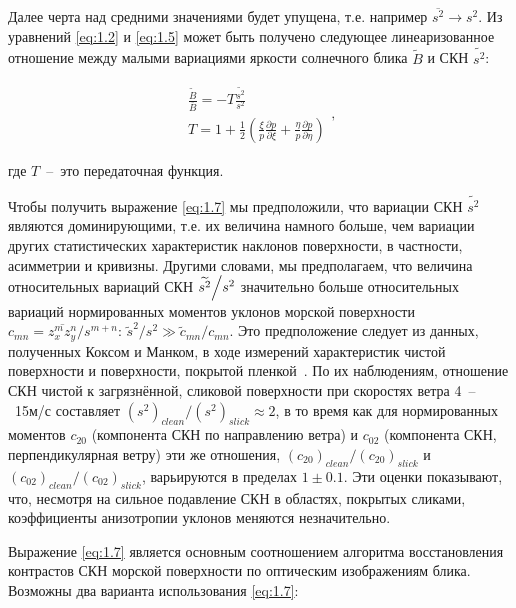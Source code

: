 Далее черта над средними значениями будет упущена, т.е. например $\overline{s^{2} }\to s^{2} $. Из уравнений \eqref{eq:1.2} и \eqref{eq:1.5} может быть получено следующее линеаризованное отношение между малыми вариациями яркости солнечного блика $\tilde{B}$ и СКН $\widetilde{s^{2} }$:


\begin{equation} \label{eq:1.7} 
	\begin{array}{l} {\frac{\tilde{B}}{\overline{B}} =-T\frac{\widetilde{s^{2} }}{s^{2} } }
	\\
	{T = 1+\frac{1}{2} \left(\frac{\xi }{p} \frac{\partial p}{\partial \xi } +\frac{\eta }{p} \frac{\partial p}{\partial \eta } \right)}
	\end{array}, 
\end{equation} 


\noindent где $T$~--~это передаточная функция.

Чтобы получить выражение \eqref{eq:1.7} мы предположили, что вариации СКН $\widetilde{s^{2} }$ являются доминирующими, т.е. их величина намного больше, чем вариации других статистических характеристик наклонов поверхности, в частности, асимметрии и кривизны. Другими словами, мы предполагаем, что величина относительных вариаций СКН ${\widetilde{s^{2} }\mathord{\left/ {\vphantom {\widetilde{s^{2} } s^{2} }} \right. \kern-\nulldelimiterspace} s^{2} } $ значительно больше относительных вариаций нормированных моментов уклонов морской поверхности $c_{mn} =\overline{z_{x}^{m} z_{y}^{n} }/s^{m+n} $: $\tilde{s}^{2} /s^{2} \gg \tilde{c}_{mn} /c_{mn} $. Это предположение следует из данных, полученных Коксом и Манком, в ходе измерений характеристик чистой поверхности и поверхности, покрытой пленкой~\citep{Cox1954, Cox1954a}. По их наблюдениям, отношение СКН чистой к загрязнённой, сликовой поверхности при скоростях ветра 4~--~15м/с составляет $(s^{2} )_{clean} /(s^{2} )_{slick} \approx 2$, в то время как для нормированных моментов $c_{20} $ (компонента СКН по направлению ветра) и $c_{02} $ (компонента СКН, перпендикулярная ветру) эти же отношения, $(c_{20} )_{clean} /(c_{20} )_{slick} $ и $(c_{02} )_{clean} /(c_{02} )_{slick} $, варьируются в пределах $1\pm 0.1$. Эти оценки показывают, что, несмотря на сильное подавление СКН в областях, покрытых сликами, коэффициенты анизотропии уклонов меняются незначительно.

Выражение \eqref{eq:1.7} является основным соотношением алгоритма восстановления контрастов СКН морской поверхности по оптическим изображениям блика. Возможны два варианта использования \eqref{eq:1.7}:

